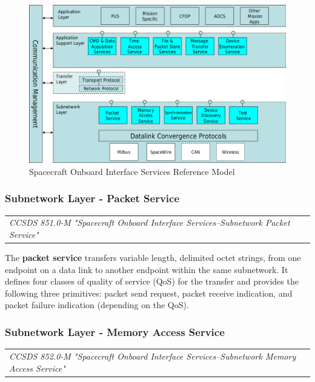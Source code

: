 \begin{figure}[h]
\centering\includegraphics[scale=0.4]{fig/spacecraft_onboard_interface_services_reference_model}
\caption{Spacecraft Onboard Interface Services Reference Model}
\label{fig:Spacecraft Onboard Interface Services Reference Model}
\end{figure}


\subsubsection{Subnetwork Layer - Packet Service}

\begin{tabular}{l}
\textit{CCSDS 851.0-M "Spacecraft Onboard Interface Services--Subnetwork Packet Service" \cite{CCSDS 851.0-M}} 
\end{tabular}

The \textbf{packet service} transfers variable length, delimited octet strings, from one endpoint on a data link to another endpoint within the same subnetwork. It defines four classes of quality of service (QoS) for the transfer and provides the following three primitives: packet send request, packet receive indication, and packet failure indication (depending on the QoS).

\subsubsection{Subnetwork Layer - Memory Access Service}

\begin{tabular}{l}
\textit{CCSDS 852.0-M "Spacecraft Onboard Interface Services--Subnetwork Memory Access Service" \cite{CCSDS 852.0-M}} 
\end{tabular}

